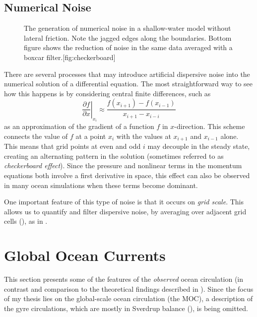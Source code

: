 \subsection{Numerical Noise}
\label{sec:noise}
\begin{figure}
	\begin{sidecaption}{The generation of numerical noise in a shallow-water model without lateral friction. Note the jagged edges along the boundaries. Bottom figure shows the reduction of noise in the same data averaged with a boxcar filter.}[fig:checkerboard]
	\antimpjustification
	\end{sidecaption}
\end{figure}
There are several processes that may introduce artificial dispersive noise into the numerical solution of a differential equation. The most straightforward way to see how this happens is by considering central finite differences, such as
%
\begin{equation}
\left. \frac{\partial f}{\partial x} \right|_{x_i} \approx \frac{f(x_{i+1}) - f(x_{i-1})}{x_{i+1} - x_{i-i}}
\end{equation}
%
as an approximation of the gradient of a function \(f\) in \(x\)-direction. This scheme connects the value of \(f\) at a point \(x_i\) with the values at \(x_{i+1}\) and \(x_{i-1}\) alone. This means that grid points at even and odd \(i\) may decouple in the steady state, creating an alternating pattern in the solution (sometimes referred to as \emph{checkerboard effect}). Since the pressure and nonlinear terms in the momentum equations both involve a first derivative in space, this effect can also be observed in many ocean simulations when these terms become dominant.

One important feature of this type of noise is that it occurs on \emph{grid scale}. This allows us to quantify and filter dispersive noise, \eg by averaging over adjacent grid cells (), as in \cite{jochum}.

\section{Global Ocean Currents}
\label{sec:physics-currents}
This section presents some of the features of the \emph{observed} ocean circulation (in contrast and comparison to the theoretical findings described in ). Since the focus of my thesis lies on the global-scale ocean circulation (the \ac{MOC}), a description of the gyre circulations, which are mostly in Sverdrup balance (), is being omitted.

